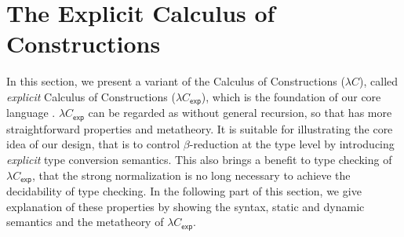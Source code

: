 \section{The Explicit Calculus of Constructions}
\label{sec:formal}




\newcommand{\expcc}{$\lambda C_{\mathsf{exp}}$\xspace}
\newcommand{\cc}{$\lambda C$\xspace}
\newcommand{\gram}[1]{\ottgrammartabular{#1\ottafterlastrule}}
\newcommand{\ruleref}[1]{\ottdrulename{#1}}

In this section, we present a variant of the Calculus of Constructions (\cc), called \emph{explicit} Calculus of Constructions (\expcc), which is the foundation of our core language \name. \expcc can be regarded as \name without general recursion, so that has more straightforward properties and metatheory. It is suitable for illustrating the core idea of our design, that is to control $\beta$-reduction at the type level by introducing \emph{explicit} type conversion semantics. This also brings a benefit to type checking of \expcc, that the strong normalization is no long necessary to achieve the decidability of type checking. In the following part of this section, we give explanation of these properties by showing the syntax, static and dynamic semantics and the metatheory of \expcc.

